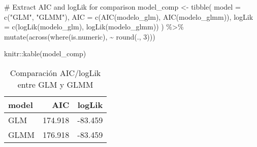 \documentclass[
  spanish,
  11pt,
  a4paper,
  DIV=11,
  numbers=noendperiod]{scrartcl}
\newenvironment{Shaded}{\begin{snugshade}}{\end{snugshade}}
\newcommand{\AttributeTok}[1]{\textcolor[rgb]{0.40,0.45,0.13}{#1}}
\newcommand{\CommentTok}[1]{\textcolor[rgb]{0.37,0.37,0.37}{#1}}
\newcommand{\DecValTok}[1]{\textcolor[rgb]{0.68,0.00,0.00}{#1}}
\newcommand{\FunctionTok}[1]{\textcolor[rgb]{0.28,0.35,0.67}{#1}}
\newcommand{\NormalTok}[1]{\textcolor[rgb]{0.00,0.23,0.31}{#1}}
\newcommand{\OtherTok}[1]{\textcolor[rgb]{0.00,0.23,0.31}{#1}}
\newcommand{\SpecialCharTok}[1]{\textcolor[rgb]{0.37,0.37,0.37}{#1}}
\newcommand{\StringTok}[1]{\textcolor[rgb]{0.13,0.47,0.30}{#1}}
\begin{document}
\begin{Shaded}
\begin{Highlighting}[numbers=left,,]
\CommentTok{\# Extract AIC and logLik for comparison}
\NormalTok{model\_comp }\OtherTok{\textless{}{-}} \FunctionTok{tibble}\NormalTok{(}
  \AttributeTok{model =} \FunctionTok{c}\NormalTok{(}\StringTok{"GLM"}\NormalTok{, }\StringTok{"GLMM"}\NormalTok{),}
  \AttributeTok{AIC =} \FunctionTok{c}\NormalTok{(}\FunctionTok{AIC}\NormalTok{(modelo\_glm), }\FunctionTok{AIC}\NormalTok{(modelo\_glmm)),}
  \AttributeTok{logLik =} \FunctionTok{c}\NormalTok{(}\FunctionTok{logLik}\NormalTok{(modelo\_glm), }\FunctionTok{logLik}\NormalTok{(modelo\_glmm))}
\NormalTok{) }\SpecialCharTok{\%\textgreater{}\%}
  \FunctionTok{mutate}\NormalTok{(}\FunctionTok{across}\NormalTok{(}\FunctionTok{where}\NormalTok{(is.numeric), }\SpecialCharTok{\textasciitilde{}} \FunctionTok{round}\NormalTok{(., }\DecValTok{3}\NormalTok{)))}

\NormalTok{knitr}\SpecialCharTok{::}\FunctionTok{kable}\NormalTok{(model\_comp)}
\end{Highlighting}
\end{Shaded}

\begin{longtable}[]{@{}lrr@{}}

\caption{\label{tbl-glmm-diag-compare}Comparación AIC/logLik entre GLM y
GLMM}

\tabularnewline

\toprule\noalign{}
model & AIC & logLik \\
\midrule\noalign{}
\endhead
\bottomrule\noalign{}
\endlastfoot
GLM & 174.918 & -83.459 \\
GLMM & 176.918 & -83.459 \\

\end{longtable}

\begin{Shaded}
\end{Shaded}
\end{document}

